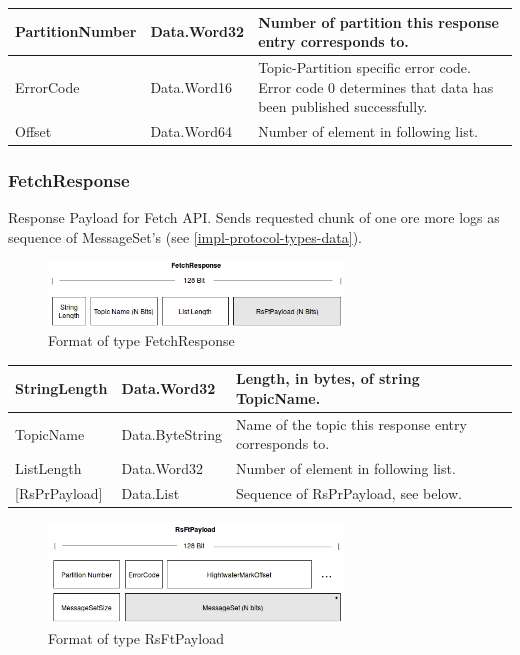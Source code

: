 \begin{table}[H]
\centering
\begin{tabular}{ l  l  p{10cm} }
\hline
PartitionNumber & Data.Word32 & Number of partition this response entry
corresponds to.                                                \\ \hline
ErrorCode       & Data.Word16 & Topic-Partition specific error code. Error code
0 determines that data has been published successfully. \\ \hline
Offset          & Data.Word64 & Number of element in following list.
\\ \hline
\end{tabular}
\end{table}

\subsubsection{FetchResponse}
Response Payload for Fetch API. Sends requested chunk of one ore more logs as
sequence of MessageSet's (see \ref{impl-protocol-types-data}). 

\begin{figure}[H]
    \centering
    \includegraphics[width=0.7\textwidth]{images/impl-prot-types-fetchResponse.png}
    \caption{Format of type FetchResponse}
\end{figure}

\begin{table}[H]
\centering
\begin{tabular}{ l  l  p{10cm} }
\hline
StringLength      & Data.Word32     & Length, in bytes, of string TopicName. \\ \hline
TopicName         & Data.ByteString & Name of the topic this response entry corresponds to.\\ \hline
ListLength        & Data.Word32     & Number of element in following list.\\ \hline
{[}RsPrPayload{]} & Data.List       & Sequence of RsPrPayload, see below.
\\ \hline
\end{tabular}
\end{table}

\begin{figure}[H]
    \centering
    \includegraphics[width=0.7\textwidth]{images/impl-prot-types-ftPayload.png}
    \caption{Format of type RsFtPayload}
\end{figure}

